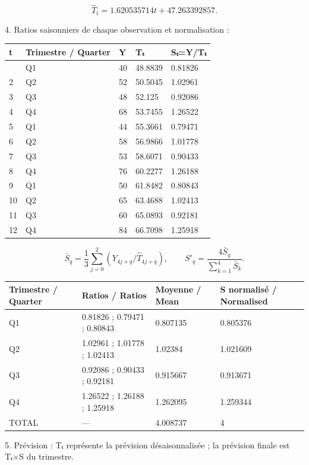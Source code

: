 \documentclass[11pt,a4paper]{article}
\begin{document}
\[\widehat T_t=1.620535714t+47.263392857.\]

4. Ratios saisonniers de chaque observation et normalisation :

\begin{longtable}[]{@{}lllll@{}}
\toprule\noalign{}
t & Trimestre / Quarter & Y & Tₜ & Sₜ=Y/Tₜ \\
\midrule\noalign{}
\endhead
\bottomrule\noalign{}
\endlastfoot
1 & Q1 & 40 & 48.8839 & 0.81826 \\
2 & Q2 & 52 & 50.5045 & 1.02961 \\
3 & Q3 & 48 & 52.125 & 0.92086 \\
4 & Q4 & 68 & 53.7455 & 1.26522 \\
5 & Q1 & 44 & 55.3661 & 0.79471 \\
6 & Q2 & 58 & 56.9866 & 1.01778 \\
7 & Q3 & 53 & 58.6071 & 0.90433 \\
8 & Q4 & 76 & 60.2277 & 1.26188 \\
9 & Q1 & 50 & 61.8482 & 0.80843 \\
10 & Q2 & 65 & 63.4688 & 1.02413 \\
11 & Q3 & 60 & 65.0893 & 0.92181 \\
12 & Q4 & 84 & 66.7098 & 1.25918 \\
\end{longtable}

\[\bar S_q=\frac{1}{3}\sum_{j=0}^2(Y_{4j+q}/\widehat T_{4j+q}),\qquad S'_q=\frac{4\bar S_q}{\sum_{k=1}^4\bar S_k}.\]

\begin{longtable}[]{@{}llll@{}}
\toprule\noalign{}
Trimestre / Quarter & Ratios / Ratios & Moyenne / Mean & S\textquotesingle{} normalisé / Normalised \\
\midrule\noalign{}
\endhead
\bottomrule\noalign{}
\endlastfoot
Q1 & 0.81826 ; 0.79471 ; 0.80843 & 0.807135 & 0.805376 \\
Q2 & 1.02961 ; 1.01778 ; 1.02413 & 1.02384 & 1.021609 \\
Q3 & 0.92086 ; 0.90433 ; 0.92181 & 0.915667 & 0.913671 \\
Q4 & 1.26522 ; 1.26188 ; 1.25918 & 1.262095 & 1.259344 \\
TOTAL & --- & 4.008737 & 4 \\
\end{longtable}

5. Prévision : Tₜ représente la prévision désaisonnalisée ; la prévision finale est Tₜ×S\textquotesingle{} du trimestre.
\end{document}

